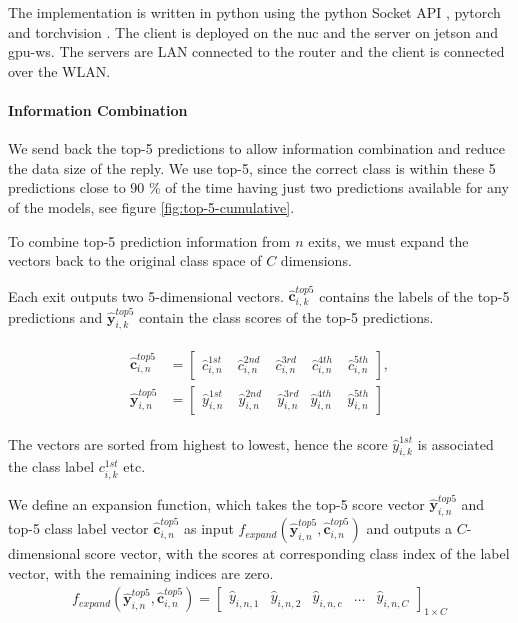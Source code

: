 The implementation is written in \gls{python} using the \gls{python} Socket API \cite{noauthor_socket_nodate}, \gls{pytorch} \cite{paszke_automatic_2017} and \gls{torchvision} \cite{marcel_torchvision_2010}. The client is deployed on the \gls{nuc} and the server on \gls{jetson} and \gls{gpu-ws}. The servers are LAN connected to the router and the client is connected over the WLAN.

\paragraph{Information Combination}

We send back the top-5 predictions to allow information combination and reduce the data size of the reply. We use top-5, since the correct class is within these 5 predictions close to 90 \% of the time having just two predictions available for any of the models, see figure \ref{fig:top-5-cumulative}.

To combine top-5 prediction information from $ n $ exits, we must expand the vectors back to the original class space of $ C $ dimensions.

Each exit outputs two 5-dimensional vectors. $\bm{\hat{c}}_{i,k}^{top5}$ contains the labels of the top-5 predictions and $ \bm{\hat{y}}_{i,k}^{top5}$ contain the class scores of the top-5 predictions. 

\begin{align}
\begin{split}
\bm{\hat{c}}_{i,n}^{top5} &= \begin{bmatrix}
\hat{c}_{i,n}^{1st} & \phantom{.}\hat{c}_{i,n}^{2nd} & \phantom{.}\hat{c}_{i,n}^{3rd} & \phantom{.}\hat{c}_{i,n}^{4th} & \phantom{.}\hat{c}_{i,n}^{5th}
\end{bmatrix}, \\
\bm{\hat{y}}^{top5}_{i,n} &= \begin{bmatrix}
\hat{y}_{i,n}^{1st} & \phantom{.}\hat{y}_{i,n}^{2nd} & \phantom{.}\hat{y}_{i,n}^{3rd} & \hat{y}_{i,n}^{4th} & \phantom{.}\hat{y}_{i,n}^{5th}
\end{bmatrix}
\end{split}
\end{align}

The vectors are sorted from highest to lowest, hence the score $ \hat{y}_{i,k}^{1st} $ is associated the class label $ c_{i,k}^{1st} $ etc. 

We define an expansion function, which takes the top-5 score vector $ \bm{\hat{y}}_{i,n}^{top5}$ and top-5 class label vector  $\bm{\hat{c}}_{i,n}^{top5}$ as input  $ f_{expand}\left(\bm{\hat{y}}_{i,n}^{top5},\bm{\hat{c}}_{i,n}^{top5}\right) $ and outputs a $ C $-dimensional score vector, with the scores at corresponding class index of the label vector, with the remaining indices are zero.
\begin{align}
f_{expand}\left(\bm{\hat{y}}_{i,n}^{top5},\bm{\hat{c}}_{i,n}^{top5}\right) = 
\begin{bmatrix}
\hat{y}_{i,n,1} & \hat{y}_{i,n,2} & \hat{y}_{i,n,c} & \dots & \hat{y}_{i,n,C}
\end{bmatrix}_{1 \times C}
\end{align}


